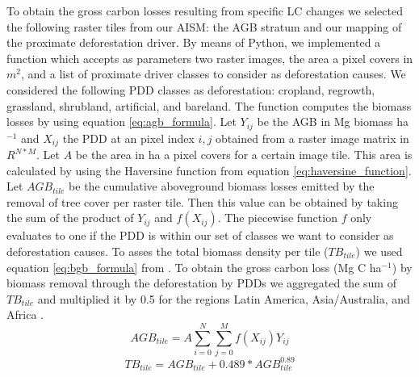 		To obtain the gross carbon losses resulting from specific \ac{LC} changes we selected the following raster tiles from our \ac{AISM}: the \ac{AGB} stratum and our mapping of the proximate deforestation driver. By means of Python, we implemented a function which accepts as parameters two raster images, the area a pixel covers in $m^2$, and a list of proximate driver classes to consider as deforestation causes. We considered the following \ac{PDD} classes as deforestation: cropland, regrowth, grassland, shrubland, artificial, and bareland. The function computes the biomass losses by using equation \ref{eq:agb_formula}. Let $Y_{ij}$ be the \ac{AGB} in Mg biomass ha$^{-1}$ and $X_{ij}$ the \ac{PDD} at an pixel index $i,j$ obtained from a raster image matrix in $R^{N*M}$. Let $A$ be the area in ha a pixel covers for a certain image tile. This area is calculated by using the Haversine function from equation \ref{eq:haversine_function}. Let $AGB_{tile}$ be the cumulative aboveground biomass losses emitted by the removal of tree cover per raster tile. Then this value can be obtained by taking the sum of the product of $Y_{ij}$ and $f(X_{ij})$. The piecewise function $f$ only evaluates to one if the \ac{PDD} is within our set of classes we want to consider as deforestation causes. To asses the total biomass density per tile ($TB_{tile}$) we used equation \ref{eq:bgb_formula} from \citet{Saatchi2011}. To obtain the gross carbon loss (Mg C ha$^{-1}$) by biomass removal through the deforestation by \acp{PDD} we aggregated the sum of $TB_{tile}$ and multiplied it by 0.5 for the regions Latin America, Asia/Australia, and Africa \citep{Achard2014}.
		\begin{equation}
		\label{eq:agb_formula}
			AGB_{tile} = A\displaystyle\sum_{i=0}^{N}\displaystyle\sum_{j=0}^{M} f(X_{ij})Y_{ij}
		\end{equation}
		\begin{equation}
		\label{eq:bgb_formula}
			TB_{tile} = AGB_{tile} + 0.489*AGB_{tile}^{0.89}
		\end{equation}
